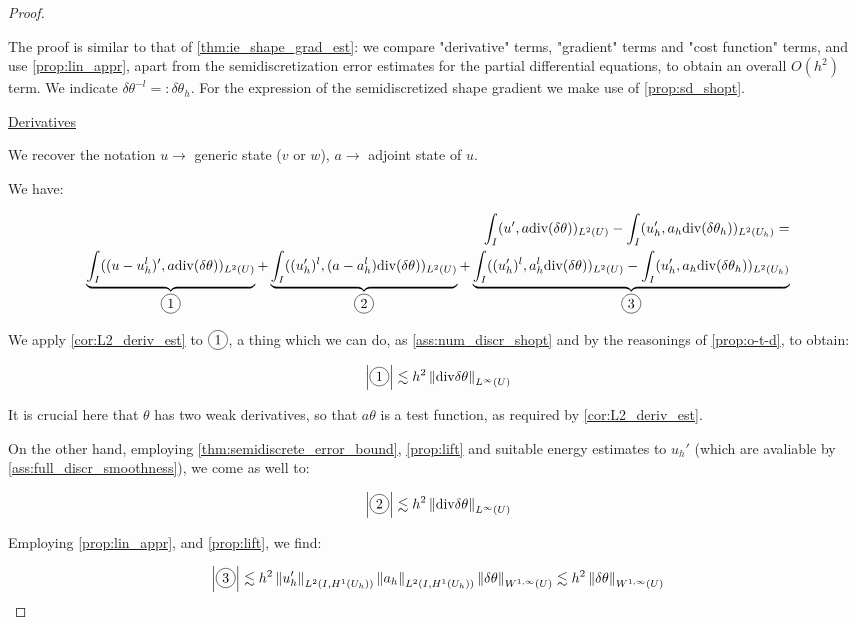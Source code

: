 \documentclass[english,a4paper,9pt,oneside]{scrbook}	%
\theoremstyle{break}
\newenvironment{mproof}[1][\proofname]{%
  \begin{proof}[#1]$ $\par\nobreak\ignorespaces
}{%
  \end{proof}
}
\renewcommand*{\proofname}{Proof}
\theoremstyle{remark}
\newcommand{\norm}[1]{\left\lVert#1\right\rVert}
\newcommand{\te}{\theta}
\newcommand{\dive}{\text{div}}
\newcommand*\circled[1]{\tikz[baseline=(char.base)]{
            \node[shape=circle,draw,inner sep=2pt] (char) {#1};}}
\begin{document}
\begin{mproof}
The proof is similar to that of \cref{thm:ie_shape_grad_est}: we compare "derivative" terms, "gradient" terms and "cost function" terms, and use \cref{prop:lin_appr}, apart from the semidiscretization error estimates for the partial differential equations, to obtain an overall $O(h^2)$ term. We indicate $\delta \te^{-l}=:\delta \te_h$. For the expression of the semidiscretized shape gradient we make use of \cref{prop:sd_shopt}.

\underline{Derivatives}

We recover the notation $u\rightarrow$ generic state ($v$ or $w$), $a\rightarrow$ adjoint state of $u$.

We have:

\begin{align*}
	\int_I(u',a\dive(\delta \te))_{L^2(U)}-\int_I (u_h',a_h\dive(\delta \te_h))_{L^2(U_h)}=\\
	\underbrace{\int_I((u-u_h^l)',a\dive(\delta \te))_{L^2(U)}}_{\circled{1}}+
	\underbrace{\int_I((u_h')^l, (a-a_h^l)\dive(\delta \te))_{L^2(U)}}_{\circled{2}}+
	\underbrace{\int_I((u_h')^l, a_h^l\dive(\delta \te))_{L^2(U)}-\int_I (u_h',a_h\dive(\delta \te_h))_{L^2(U_h)}}_{\circled{3}}
\end{align*}

We apply \cref{cor:L2_deriv_est} to $\circled{1}$, a thing which we can do, as \cref{ass:num_discr_shopt} and by the reasonings of \cref{prop:o-t-d}, to obtain:

\begin{align*}
	\left | \circled{1} \right | \lesssim h^2\norm{\dive{\delta \theta}}_{L^\infty(U)}
\end{align*}

It is crucial here that $\te$ has two weak derivatives, so that $a\te$ is a test function, as required by \cref{cor:L2_deriv_est}. 

On the other hand, employing \cref{thm:semidiscrete_error_bound}, \cref{prop:lift} and suitable energy estimates to $u_h'$ (which are avaliable by \cref{ass:full_discr_smoothness}), we come as well to:

\begin{align*}
	\left | \circled{2} \right | \lesssim h^2\norm{\dive{\delta \theta}}_{L^\infty(U)}
\end{align*}

Employing \cref{prop:lin_appr}, and \cref{prop:lift}, we find:

\begin{align*}
	\left | \circled{3} \right |\lesssim  h^2 \norm{u_h'}_{L^2(I,H^1(U_h))}\norm{a_h}_{L^2(I,H^1(U_h))}\norm{\delta \te}_{W^{1,\infty}(U)} \lesssim  h^2 \norm{\delta \te}_{W^{1,\infty}(U)}
\end{align*}


\end{mproof}
\end{document}
